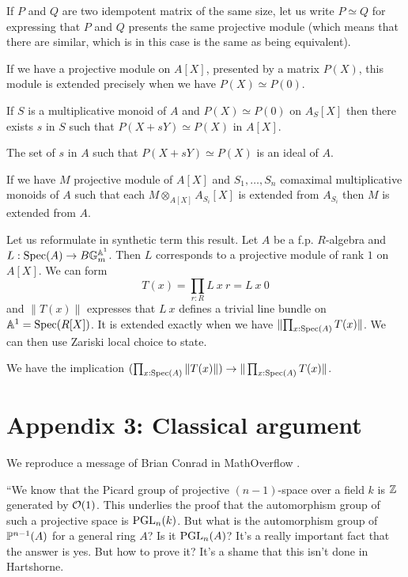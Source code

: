 If $P$ and $Q$ are two idempotent matrix of the same size, let us write $P\simeq Q$ for expressing that $P$ and $Q$ presents
the same projective module (which means that there are similar, which is in this case is the same as being equivalent).

If we have a projective module on $A[X]$, presented by a matrix $P(X)$, this module is extended
precisely when we have $P(X)\simeq P(0)$.

\begin{lemma}
  If $S$ is a multiplicative monoid of $A$ and $P(X)\simeq P(0)$ on $A_S[X]$ then there exists
  $s$ in $S$ such that $P(X+sY)\simeq P(X)$ in $A[X]$.
\end{lemma}

\begin{lemma}
  The set of $s$ in $A$ such that $P(X+sY)\simeq P(X)$ is an ideal of $A$.
\end{lemma}

\begin{corollary}
  If we have $M$ projective module of $A[X]$ and $S_1,\dots,S_n$ comaximal multiplicative monoids of $A$
  such that each $M\otimes_{A[X]} A_{S_i}[X]$ is extended from $A_{S_i}$ then $M$ is extended from $A$.
\end{corollary}

Let us reformulate in synthetic term this result. Let $A$ be a f.p. $R$-algebra and $L:\operatorname{Spec}(A)\rightarrow B\mathbb{G}_m^{\mathbb{A}^1}$.
Then $L$ corresponds to a projective module of rank $1$ on $A[X]$. We can form
$$T(x) = \prod_{r:R}L~x~r = L~x~0$$
and $\|T(x)\|$ expresses that $L~x$ defines a trivial line bundle on $\mathbb{A}^1 = \operatorname{Spec}(R[X])$.
It is extended exactly when we have
$\|{\prod_{x:\operatorname{Spec}(A)}T(x)}\|$. We can then use Zariski local choice to state.

\begin{proposition}\label{c2}
  We have the implication $(\prod_{x:\operatorname{Spec}(A)}\|T(x)\|)\rightarrow \|\prod_{x:\operatorname{Spec}(A)}T(x)\|$.
\end{proposition}

\newpage

\section*{Appendix 3: Classical argument}

We reproduce a message of Brian Conrad in MathOverflow \cite{conrad-mathoverflow-16324}.

\medskip

``We know that the Picard group of projective $(n-1)$-space over a field $k$ is $\mathbb{Z}$
generated by $\mathcal{O}(1)$.
This underlies the proof that the automorphism group of such a projective space is $\operatorname{PGL}_n(k)$.
But what is the automorphism group of $\mathbb{P}^{n-1}(A)$ for a general ring $A$? Is it $\operatorname{PGL}_n(A)$?
It's a really important fact that the answer is yes.
But how to prove it? It's a shame that this isn't done in Hartshorne.

